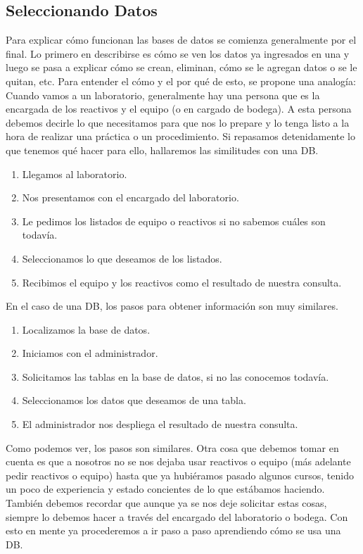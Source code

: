 \documentclass[10pt,letterpaper]{article}
\begin{document}
\subsection{Seleccionando Datos}
Para explicar c\'omo funcionan las bases de datos se comienza generalmente por el final. Lo primero en describirse es c\'omo se ven los datos ya ingresados en una y luego se pasa a explicar c\'omo se crean, eliminan, c\'omo se le agregan datos o se le quitan, etc. Para entender el c\'omo y el por qu\'e de esto, se propone una analog\'ia:\\

Cuando vamos a un laboratorio, generalmente hay una persona que es la encargada de los reactivos y el equipo (o en cargado de bodega). A esta persona debemos decirle lo que necesitamos para que nos lo prepare y lo tenga listo a la hora de realizar una pr\'actica o un procedimiento. Si repasamos detenidamente lo que tenemos qu\'e hacer para ello, hallaremos las similitudes con una DB.
\begin{enumerate}
\item Llegamos al laboratorio.
\item Nos presentamos con el encargado del laboratorio.
\item Le pedimos los listados de equipo o reactivos si no sabemos cu\'ales son todav\'ia.
\item Seleccionamos lo que deseamos de los listados.
\item Recibimos el equipo y los reactivos como el resultado de nuestra consulta.
\end{enumerate}
En el caso de una DB, los pasos para obtener informaci\'on son muy similares.
\begin{enumerate}
\item Localizamos la base de datos.
\item Iniciamos con el administrador.
\item Solicitamos las tablas en la base de datos, si no las conocemos todav\'ia.
\item Seleccionamos los datos que deseamos de una tabla.
\item El administrador nos despliega el resultado de nuestra consulta.
\end{enumerate}
Como podemos ver, los pasos son similares. Otra cosa que debemos tomar en cuenta es que a nosotros no se nos dejaba usar reactivos o equipo (m\'as adelante pedir reactivos o equipo) hasta que ya hubi\'eramos pasado algunos cursos, tenido un poco de experiencia y estado concientes de lo que est\'abamos haciendo. Tambi\'en debemos recordar que aunque ya se nos deje solicitar estas cosas, siempre lo debemos hacer a trav\'es del encargado del laboratorio o bodega. Con esto en mente ya procederemos a ir paso a paso aprendiendo c\'omo se usa una DB.\\
\end{document}
